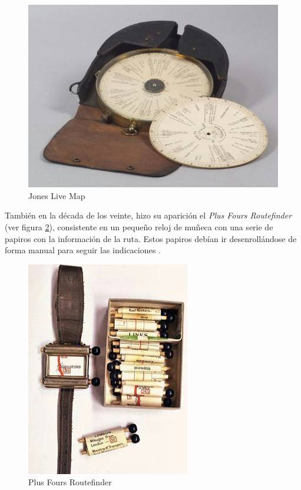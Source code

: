 \begin{figure}[h!btp]
\centering
\includegraphics[scale=0.5, fbox={\fboxrule} 4mm]{images/03-antecedentes/06-jones_live_map.png}
\caption{Jones Live Map}
\label{fig:jones_live_map}
\end{figure}

También en la década de los veinte, hizo su aparición el \textit{Plus Fours Routefinder} (ver figura \ref{fig:plus_fours_routefinder}), consistente en un pequeño reloj de muñeca con una serie de papiros con la información de la ruta. Estos papiros debían ir desenrollándose de forma manual para seguir las indicaciones \cite{Plus14}.

\begin{figure}[h!btp]
\centering
\includegraphics[scale=0.5, fbox={\fboxrule} 4mm]{images/03-antecedentes/07-plus_fours_routefinder.png}
\caption{Plus Fours Routefinder}
\label{fig:plus_fours_routefinder}
\end{figure}

